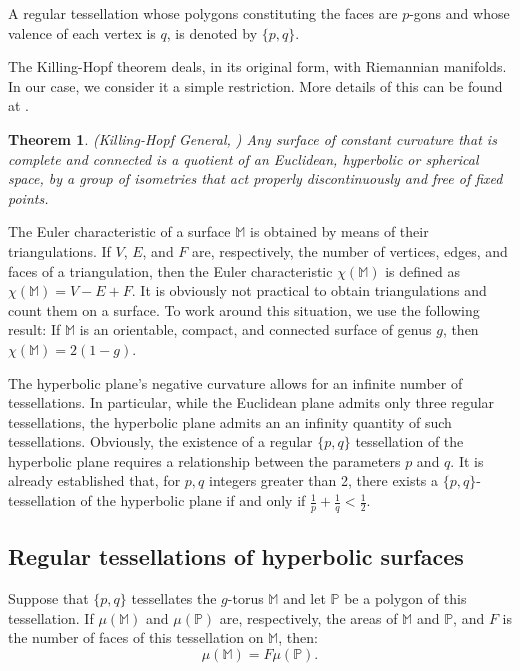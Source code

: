 \documentclass[%
reprint,
amsmath,amssymb,
aps,
]{revtex4-2}
\newtheorem{theorem}{Theorem}[section]
\newcommand{\M}{\mathbb{M}}
\begin{document}
A regular tessellation whose polygons constituting the faces are $p$-gons and whose valence of each vertex is $q$, is denoted by $\{p, q\}$.

The Killing-Hopf theorem deals, in its original form, with Riemannian manifolds. In our case, we consider it a simple restriction. More details of this can be found at \cite{stillwell1995geometry}.

\begin{theorem}	(Killing-Hopf General, \cite{stillwell1995geometry}) 
	Any surface of constant curvature that is complete and connected is a quotient of an 
	Euclidean, hyperbolic or spherical space, by a group of isometries that act properly discontinuously and free of fixed points.   
\end{theorem}

The Euler characteristic of a surface $\M$ is obtained by means of their triangulations. If $V$, $E$, and $F$ are, respectively, the number of vertices, edges, and faces of a triangulation, then the Euler characteristic $\chi(\M)$ is defined as 
$\chi(\M) = V - E + F$. It is obviously not practical to obtain triangulations and count them on a surface. To work around this situation, we use the following result: If $\M$ is an orientable, compact, and connected surface of genus $g$, then $ \chi(\M)=2(1-g)$.

The hyperbolic plane's negative curvature allows for an infinite number of tessellations. In particular, while the Euclidean plane admits only three regular tessellations, the hyperbolic plane admits an an infinity quantity of such tessellations. Obviously, the existence of a regular $\{p, q\}$ tessellation  of the hyperbolic plane requires a relationship between the parameters $ p $ and $ q $. It is already established that, for $ p, q $ integers greater than 2, there exists a $ \{p,q\} $-tessellation of the hyperbolic plane if and only if $ \frac 1 p + \frac 1 q <\frac 1 2$. 

\subsection{Regular tessellations of hyperbolic surfaces}

Suppose that $\{p, q\}$ tessellates the $g$-torus $\M$ and let $\mathbb{P}$ 
be a polygon of this tessellation. If $\mu(\M)$ and $\mu(\mathbb{P})$ are, 
respectively, the areas of $ \M$ and $ \mathbb{P} $, and $F$ is the number of 
faces of this tessellation on $  \M  $, then:
\begin{equation}\label{eq:condicao-area}
	\mu (\M ) =F\mu(\mathbb{P}).
\end{equation}
\end{document}
